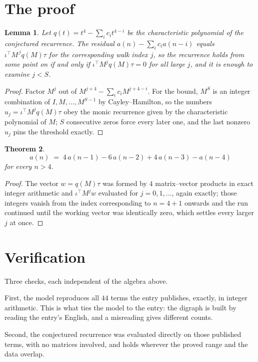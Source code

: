 \documentclass[11pt,a4paper]{article}
\theoremstyle{plain}
\newtheorem{theorem}{Theorem}
\newtheorem{lemma}[theorem]{Lemma}
\theoremstyle{definition}
\begin{document}
\section{The proof}

\begin{lemma}\label{lem:crit}
Let $q(t)=t^{4}-\sum_i c_it^{4-i}$ be the characteristic polynomial of the
conjectured recurrence. The residual $a(n)-\sum_ic_ia(n-i)$ equals
$\iota^{\!\top}M^{\,j}q(M)\tau$ for the corresponding walk index $j$, so the recurrence
holds from some point on if and only if $\iota^{\!\top}M^{j}q(M)\tau=0$ for all large $j$,
and it is enough to examine $j<S$.
\end{lemma}

\begin{proof}
Factor $M^{j}$ out of $M^{j+4}-\sum_ic_iM^{j+4-i}$. For the bound, $M^{S}$
is an integer combination of $I,M,\dots,M^{S-1}$ by Cayley--Hamilton, so the numbers
$u_j=\iota^{\!\top}M^{j}q(M)\tau$ obey the monic recurrence given by the characteristic
polynomial of $M$; $S$ consecutive zeros force every later one, and the last nonzero $u_j$
pins the threshold exactly.
\end{proof}

\begin{theorem}
\[
a(n)\;=\;4\,a(n-1) - 6\,a(n-2) + 4\,a(n-3) - a(n-4)
\]
for every $n>4$.
\end{theorem}

\begin{proof}
The vector $w=q(M)\tau$ was formed by $4$ matrix--vector products in exact integer
arithmetic and $\iota^{\!\top}M^{j}w$ evaluated for $j=0,1,\dots$, again exactly; those
integers vanish from the index corresponding to $n=4+1$ onwards and the run continued
until the working vector was identically zero, which settles every larger $j$ at once.
\end{proof}

\section{Verification}

Three checks, each independent of the algebra above.

First, the model reproduces all $44$ terms the entry publishes, exactly, in integer
arithmetic. This is what ties the model to the entry: the digraph is built by reading the
entry's English, and a misreading gives different counts.

Second, the conjectured recurrence was evaluated directly on those published terms, with no
matrices involved, and holds wherever the proved range and the data overlap.
\end{document}
